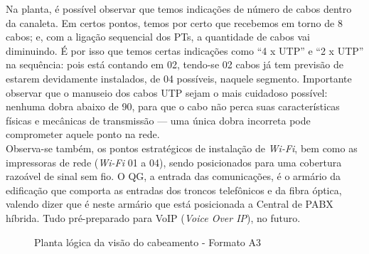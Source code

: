 \documentclass[	DIV=calc,%
							paper=a4,%
							fontsize=12pt,%
							onecolumn]{scrartcl}	 					%
\begin{document}
Na planta, é possível observar que temos indicações de número de cabos dentro da canaleta. Em certos pontos, temos por certo que recebemos em torno de 8 cabos; e, com a ligação sequencial dos PTs, a quantidade de cabos vai diminuindo. É por isso que temos certas indicações como ``4 x UTP'' e ``2 x UTP'' na sequência: pois está contando em 02, tendo-se 02 cabos já tem previsão de estarem devidamente instalados, de 04 possíveis, naquele segmento. Importante observar que o manuseio dos cabos UTP sejam o mais cuidadoso possível: nenhuma dobra abaixo de 90, para que o cabo não perca suas características físicas e mecânicas de transmissão --- uma única dobra incorreta pode comprometer aquele ponto na rede. 
\\

Observa-se também, os pontos estratégicos de instalação de \textit{Wi-Fi}, bem como as impressoras de rede (\textit{Wi-Fi} 01 a 04), sendo posicionados para uma cobertura razoável de sinal sem fio. O QG, a entrada das comunicações, é o armário da edificação que comporta as entradas dos troncos telefônicos e da fibra óptica, valendo dizer que é neste armário que está posicionada a Central de PABX híbrida. Tudo pré-preparado para VoIP (\textit{Voice Over IP}), no futuro.




\clearpage
\thispagestyle{empty}

\recalctypearea

\begin{figure}
	\noindent{}
	\caption{Planta lógica da visão do cabeamento - Formato A3}
	\label{fig2}
\end{figure}
\end{document}
